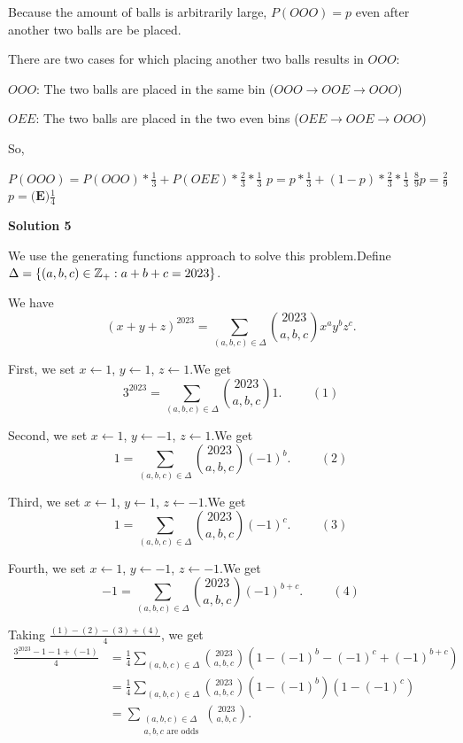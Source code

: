 \begin{enumerate}
 Because the amount of balls is arbitrarily large, $P(OOO) = p$ even after another two balls are be placed.

 There are two cases for which placing another two balls results in $OOO$:

 $OOO$: The two balls are placed in the same bin ($OOO\to OOE\to OOO$)

 $OEE$: The two balls are placed in the two even bins ($OEE\to OOE \to OOO$)

 So, 

 $P(OOO) = P(OOO) * \frac{1}{3} + P(OEE) * \frac{2}{3} * \frac{1}{3}$
$p = p * \frac{1}{3} + (1-p) * \frac{2}{3} * \frac{1}{3}$
$\frac{8}{9}p = \frac{2}{9}$
$p = \boxed {\textbf {(E)} \frac {1}{4}}$




\textbf{Solution 5}

We use the generating functions approach to solve this problem.Define $\Delta = \left\{ \left( a, b, c \right) \in \Bbb Z_+: a+b+c = 2023 \right\}$.

 We have
 \[ \left( x + y + z \right)^{2023} = \sum_{(a,b,c) \in \Delta} \binom{2023}{a,b,c} x^a y^b z^c . \]

 First, we set $x \leftarrow 1$, $y \leftarrow 1$, $z \leftarrow 1$.We get
 \[ 3^{2023} = \sum_{(a,b,c) \in \Delta} \binom{2023}{a,b,c} 1 . \hspace{1cm} (1) \]

 Second, we set $x \leftarrow 1$, $y \leftarrow -1$, $z \leftarrow 1$.We get
 \[ 1 = \sum_{(a,b,c) \in \Delta} \binom{2023}{a,b,c} (-1)^b . \hspace{1cm} (2) \]

 Third, we set $x \leftarrow 1$, $y \leftarrow 1$, $z \leftarrow -1$.We get
 \[ 1 = \sum_{(a,b,c) \in \Delta} \binom{2023}{a,b,c} (-1)^c . \hspace{1cm} (3) \]

 Fourth, we set $x \leftarrow 1$, $y \leftarrow -1$, $z \leftarrow -1$.We get
 \[ -1 = \sum_{(a,b,c) \in \Delta} \binom{2023}{a,b,c} (-1)^{b+c} . \hspace{1cm} (4) \]

 Taking $\frac{(1)-(2) - (3)+(4)}{4}$, we get
 \begin{align*} \frac{3^{2023} - 1 - 1 + (-1)}{4} & = \frac{1}{4} \sum_{(a,b,c) \in \Delta} \binom{2023}{a,b,c}  \left( 1 - (-1)^b - (-1)^c + (-1)^{b+c} \right) \\ & = \frac{1}{4} \sum_{(a,b,c) \in \Delta} \binom{2023}{a,b,c}  \left( 1 - (-1)^b \right) \left( 1 - (-1)^c \right) \\ & = \sum_{\substack{(a,b,c) \in \Delta \\ a, b, c \mbox{ are odds}}} \binom{2023}{a,b,c} . \end{align*}



\end{enumerate}
